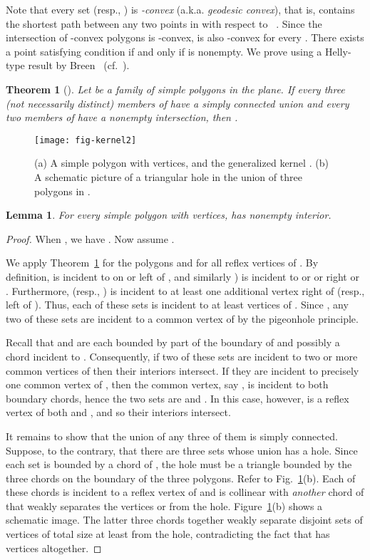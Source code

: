 \documentclass[12pt]{article}
\newtheorem{lemma}{Lemma}
\newtheorem{theorem}{Theorem}
\begin{document}
Note that every set  (resp., ) is \emph{-convex} (a.k.a.  \emph{geodesic convex}),
that is,  contains the shortest path between any two points in  with respect to ~\cite{BKOW14,DEH04,Tou86}. Since the intersection of -convex polygons is -convex,  is also -convex for every .
There exists a point  satisfying condition  if and only if  is nonempty. We prove  using a Helly-type result by Breen~\cite{Breen} (cf.~\cite{Breen98,Molnar57}).

\begin{theorem}[\cite{Breen}]\label{thm:Breen}
Let  be a family of simple polygons in the plane. If every three (not necessarily distinct)
members of  have a simply connected union and every two members of 
have a nonempty intersection, then .
\end{theorem}
\begin{figure}[htp]
  \centering
  \texttt{[image: fig-kernel2]}
  \caption{\label{fig:kernel2}
(a) A simple polygon  with  vertices, and the generalized kernel .
(b) A schematic picture of a triangular hole in the union of three polygons in .}
\end{figure}
\begin{lemma}\label{lem:kernel}
  For every simple polygon  with  vertices,  has nonempty interior.
\end{lemma}
\begin{proof}
When , we have .
Now assume .

We apply Theorem~\ref{thm:Breen} for the polygons  and
 for all reflex vertices  of . By definition,
 is incident to  on or left of , and similarly ) is incident to  or or right or .
Furthermore,  (resp., )
is incident to at least one additional vertex right of 
(resp., left of ). Thus, each of these sets is incident to
at least  vertices of . Since ,
any two of these sets are incident to a common vertex of  by the pigeonhole principle.

Recall that  and  are each bounded by part of the boundary of 
and possibly a chord incident to . Consequently, if two of these sets are incident
to two or more common vertices of  then their interiors intersect. If they are incident
to precisely one common vertex of , then the common vertex, say , is incident to
both boundary chords, hence the two sets are  and . In this case, however,
 is a reflex vertex of both  and , and so their interiors intersect.

It remains to show that the union of any three of them is simply connected.
Suppose, to the contrary, that there are three sets whose union has a hole. Since each set is bounded by a chord of , the hole must be a triangle bounded by the three chords on the boundary of the three polygons. Refer to Fig.~\ref{fig:kernel2}(b).
Each of these chords is incident to a reflex vertex of  and is collinear with \emph{another} chord of  that weakly separates the vertices
 or
 from the hole.
Figure~\ref{fig:kernel2}(b) shows a schematic image.
The latter three chords together weakly separate disjoint sets of vertices
  of total size at least  from the hole,
contradicting the fact that  has  vertices altogether.
\end{proof}
\end{document}
